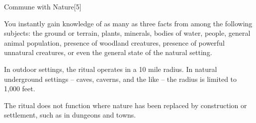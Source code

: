\begin{spellsection}{Commune with Nature}[5]
    \begin{spellheader}
    \end{spellheader}
    \begin{spellcontent}
        \begin{spelltargetinginfo}
        \end{spelltargetinginfo}
        \begin{spelleffects}

            \spellline
            \spelleffect You instantly gain knowledge of as many as three facts from among the following subjects: the ground or terrain, plants, minerals, bodies of water, people, general animal population, presence of woodland creatures, presence of powerful unnatural creatures, or even the general state of the natural setting.
            \par In outdoor settings, the ritual operates in a 10 mile radius. In natural underground settings -- caves, caverns, and the like -- the radius is limited to 1,000 feet.
        \end{spelleffects}
    \end{spellcontent}
    \begin{spellfooter}
        \spellnotes The ritual does not function where nature has been replaced by construction or settlement, such as in dungeons and towns.
    \end{spellfooter}
\end{spellsection}

